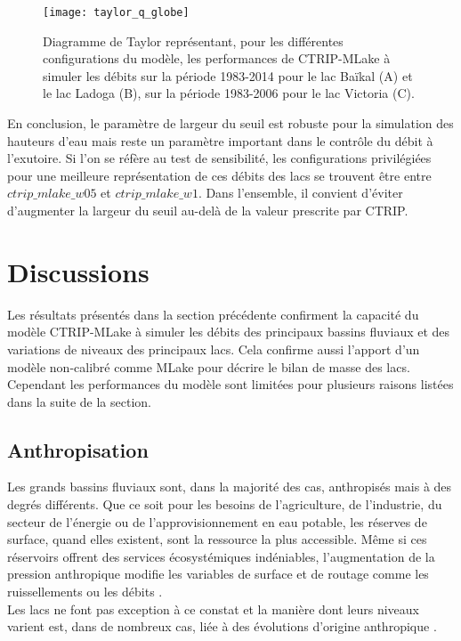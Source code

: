 \begin{figure}[h!]
\texttt{[image: taylor\_q\_globe]}
\caption{Diagramme de Taylor représentant, pour les différentes configurations du modèle, les performances de CTRIP-MLake à simuler les débits sur la période 1983-2014 pour le lac Baïkal (A) et le lac Ladoga (B), sur la période 1983-2006 pour le lac Victoria (C).}
\label{q_globe_taylor}
\end{figure}

En conclusion, le paramètre de largeur du seuil est robuste pour la simulation des hauteurs d'eau mais reste un paramètre important dans le contrôle du débit à l'exutoire. Si l'on se réfère au test de sensibilité, les configurations privilégiées pour une meilleure représentation de ces débits des lacs se trouvent être entre $ctrip\_mlake\_w05$ et $ctrip\_mlake\_w1$. Dans l'ensemble, il convient d'éviter d'augmenter la largeur du seuil au-delà de la valeur prescrite par CTRIP.

\clearpage

\section{{\selectfont Discussions}}
\label{sec:discussions_globe}

Les résultats présentés dans la section précédente confirment la capacité du modèle CTRIP-MLake à simuler les débits des principaux bassins fluviaux et des variations de niveaux des principaux lacs. Cela confirme aussi l'apport d'un modèle non-calibré comme MLake pour décrire le bilan de masse des lacs.\\
Cependant les performances du modèle sont limitées pour plusieurs raisons listées dans la suite de la section.

\subsection{{\selectfont Anthropisation}}

Les grands bassins fluviaux sont, dans la majorité des cas, anthropisés mais à des degrés différents. Que ce soit pour les besoins de l'agriculture, de l'industrie, du secteur de l'énergie ou de l'approvisionnement en eau potable, les réserves de surface, quand elles existent, sont la ressource la plus accessible. Même si ces réservoirs offrent des services écosystémiques indéniables, l'augmentation de la pression anthropique modifie les variables de surface et de routage comme les ruissellements ou les débits \citep{grill2019, best2019}.\\
Les lacs ne font pas exception à ce constat et la manière dont leurs niveaux varient est, dans de nombreux cas, liée à des évolutions d'origine anthropique \citep{wurtsbaugh2017, woolway2020}.\\


